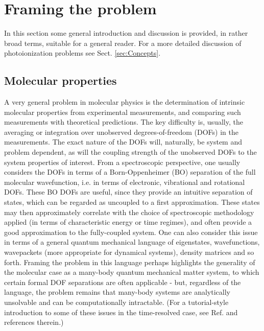 \section{Framing the problem\label{sec:Framing}}

In this section some general introduction and discussion is provided, in rather broad terms, suitable for a general reader. For a more detailed discussion of photoionization problems see Sect. \ref{sec:Concepts}.

\subsection{Molecular properties}
A very general problem in molecular physics is the determination of intrinsic molecular properties from experimental measurements, and comparing such measurements with theoretical predictions. The key difficulty is, usually, the averaging or integration over unobserved degrees-of-freedom (DOFs) in the measurements. The exact nature of the DOFs will, naturally, be system and problem dependent, as will the coupling strength of the unobserved DOFs to the system properties of interest. From a spectroscopic perspective, one usually considers the DOFs in terms of a Born-Oppenheimer (BO) separation of the full molecular wavefunction, i.e. in terms of electronic, vibrational and rotational DOFs. These BO DOFs are useful, since they provide an intuitive separation of states, which can be regarded as uncoupled to a first approximation. These states may then approximately correlate with the choice of spectroscopic methodology applied (in terms of characteristic energy or time regimes), and often provide a good approximation to the fully-coupled system. One can also consider this issue in terms of a general quantum mechanical language of eigenstates, wavefunctions, wavepackets (more appropriate for dynamical systems), density matrices and so forth. Framing the problem in this language perhaps highlights the generality of the molecular case as a many-body quantum mechanical matter system, to which certain formal DOF separations are often applicable - but, regardless of the language, the problem remains that many-body systems are analytically unsolvable and can be computationally intractable. 
(For a tutorial-style introduction to some of these issues in the time-resolved case, see Ref. \cite{wu2011TimeresolvedPhotoelectronSpectroscopy} and references therein.) %

